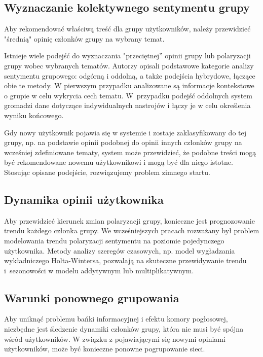 \subsection{Wyznaczanie kolektywnego sentymentu grupy}

Aby rekomendować właściwą treść dla grupy użytkowników, należy przewidzieć "średnią" opinię członków grupy na wybrany temat. 

Istnieje wiele podejść do wyznaczania "przeciętnej” opinii grupy lub polaryzacji grupy wobec wybranych tematów. Autorzy \cite{rathod} opisali podstawowe kategorie analizy sentymentu grupowego: odgórną i oddolną, a także podejścia hybrydowe, łączące obie te metody. W pierwszym przypadku analizowane są informacje kontekstowe o grupie w celu wykrycia cech tematu. W~przypadku podejść oddolnych system gromadzi dane dotyczące indywidualnych nastrojów i łączy je w celu określenia wyniku końcowego.

Gdy nowy użytkownik pojawia się w systemie i zostaje zaklasyfikowany do tej grupy, np. na podstawie opinii podobnej do opinii innych członków grupy na wcześniej zdefiniowane tematy, system może przewidzieć, że podobne treści mogą być rekomendowane nowemu użytkownikowi i mogą być dla niego istotne. Stosując opisane podejście, rozwiązujemy problem zimnego startu.

\subsection{Dynamika opinii użytkownika}

Aby przewidzieć kierunek zmian polaryzacji grupy, konieczne jest prognozowanie trendu każdego członka grupy. We wcześniejszych pracach \cite{maleszka1} rozważany był problem modelowania trendu polaryzacji sentymentu na poziomie pojedynczego użytkownika. Metody analizy szeregów czasowych, np. model wygładzania wykładniczego Holta-Wintersa, pozwalają na skuteczne przewidywanie trendu i~sezonowości w modelu addytywnym lub multiplikatywnym.

\subsection{Warunki ponownego grupowania}\label{con}

Aby uniknąć problemu bańki informacyjnej i efektu komory pogłosowej, niezbędne jest śledzenie dynamiki członków grupy, która nie musi być spójna wśród użytkowników. W związku z pojawiającymi się nowymi opiniami użytkowników, może być konieczne ponowne pogrupowanie sieci.

